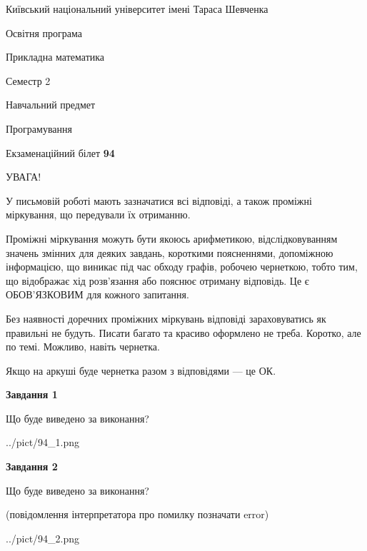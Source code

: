 \documentclass[12pt, ukrainian]{article}
\begin{document}
{{\begin {small}\par
{ \center  Київський національний університет імені Тараса Шевченка \par}
{\parbox {5 cm}{Освітня програма \hfill}{\parbox {7 cm}{Прикладна математика\hfill}}\parbox {6 cm}{\hfill Семестр 2}}\par
{\parbox {5 cm} {Навчальний предмет \hfill}\parbox {7 cm}{Програмування \hfill}\parbox {6cm}{\hfill}\par}\vspace{-7pt} \end{small}}{\center Екзаменаційний білет \No \textbf
{ 94 }\par}}
{
\begin {large}
УВАГА!

У письмовій роботі мають зазначатися всі відповіді, а також проміжні міркування, що передували їх отриманню.

Проміжні міркування можуть бути якоюсь арифметикою, відслідковуванням зна\-чень змінних для деяких завдань,
короткими поясненнями, допоміжною інформацією, що виникає під час обходу графів, робочею чернеткою,
тобто тим, що відображає хід розв’язання або пояснює отриману відповідь.
Це є ОБОВ’ЯЗКОВИМ для кожного запитання.

Без наявності доречних проміжних міркувань відповіді зараховуватись як правиль\-ні не будуть.
Писати багато та красиво оформлено не треба. Коротко, але по темі. Можли\-во, навіть чернетка.

Якщо на аркуші буде чернетка разом з відповідями --- це ОК.

\newpage

{\begin {center}\textbf{Завдання 1}\end {center}}\par
Що буде виведено за виконання?\par
\begin{center}
	{../pict/94_1.png}
\end{center}
\newpage

{\begin {center}\textbf{Завдання 2}\end {center}}\par
Що буде виведено за виконання?\par
 (повідомлення інтерпретатора про помилку позначати error)\par
\begin{center}
	{../pict/94_2.png}
\end{center}
\newpage


\end{large}}
\end{document}

